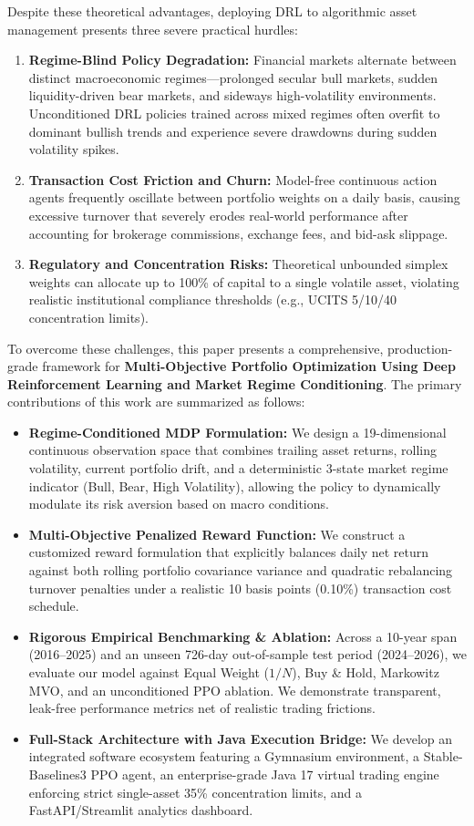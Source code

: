 \documentclass[conference]{IEEEtran}
\begin{document}
Despite these theoretical advantages, deploying DRL to algorithmic asset management presents three severe practical hurdles:
\begin{enumerate}
    \item \textbf{Regime-Blind Policy Degradation:} Financial markets alternate between distinct macroeconomic regimes---prolonged secular bull markets, sudden liquidity-driven bear markets, and sideways high-volatility environments. Unconditioned DRL policies trained across mixed regimes often overfit to dominant bullish trends and experience severe drawdowns during sudden volatility spikes.
    \item \textbf{Transaction Cost Friction and Churn:} Model-free continuous action agents frequently oscillate between portfolio weights on a daily basis, causing excessive turnover that severely erodes real-world performance after accounting for brokerage commissions, exchange fees, and bid-ask slippage.
    \item \textbf{Regulatory and Concentration Risks:} Theoretical unbounded simplex weights can allocate up to 100\% of capital to a single volatile asset, violating realistic institutional compliance thresholds (e.g., UCITS 5/10/40 concentration limits).
\end{enumerate}

To overcome these challenges, this paper presents a comprehensive, production-grade framework for \textbf{Multi-Objective Portfolio Optimization Using Deep Reinforcement Learning and Market Regime Conditioning}. The primary contributions of this work are summarized as follows:
\begin{itemize}
    \item \textbf{Regime-Conditioned MDP Formulation:} We design a 19-dimensional continuous observation space that combines trailing asset returns, rolling volatility, current portfolio drift, and a deterministic 3-state market regime indicator (Bull, Bear, High Volatility), allowing the policy to dynamically modulate its risk aversion based on macro conditions.
    \item \textbf{Multi-Objective Penalized Reward Function:} We construct a customized reward formulation that explicitly balances daily net return against both rolling portfolio covariance variance and quadratic rebalancing turnover penalties under a realistic 10 basis points (0.10\%) transaction cost schedule.
    \item \textbf{Rigorous Empirical Benchmarking \& Ablation:} Across a 10-year span (2016--2025) and an unseen 726-day out-of-sample test period (2024--2026), we evaluate our model against Equal Weight ($1/N$), Buy \& Hold, Markowitz MVO, and an unconditioned PPO ablation. We demonstrate transparent, leak-free performance metrics net of realistic trading frictions.
    \item \textbf{Full-Stack Architecture with Java Execution Bridge:} We develop an integrated software ecosystem featuring a Gymnasium environment, a Stable-Baselines3 PPO agent, an enterprise-grade Java 17 virtual trading engine enforcing strict single-asset 35\% concentration limits, and a FastAPI/Streamlit analytics dashboard.
\end{itemize}
\end{document}
